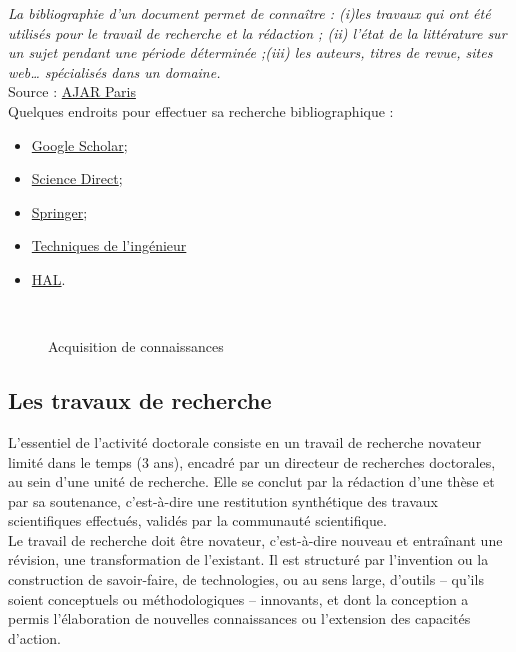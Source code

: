 \documentclass[a4paper,12pt]{report}
\begin{document}
\textit{La bibliographie d'un document permet de connaître : (i)les travaux qui ont été utilisés pour le travail de recherche et la rédaction ; (ii) l’état de la littérature sur un sujet pendant une période déterminée ;(iii) les auteurs, titres de revue, sites web… spécialisés dans un domaine.} \\

Source : \href{http://www.ajar-online.fr/thesememoire-2-recherche-bibliographique/}{AJAR Paris}    \\

Quelques endroits pour effectuer sa recherche bibliographique :
\begin{itemize}
\item \href{https://scholar.google.fr/}{Google Scholar};
\item \href{https://www-sciencedirect-com.camphrier-1.grenet.fr/}{Science Direct};
\item \href{https://link-springer-com.camphrier-1.grenet.fr/}{Springer};
\item \href{https://www-techniques-ingenieur-fr.camphrier-1.grenet.fr/}{Techniques de l'ingénieur}
\item \href{https://hal.archives-ouvertes.fr/}{HAL}.
\end{itemize}

\ \\

\begin{figure}[hbtp]
	\centering
	\def\svgwidth{1\columnwidth}
	\fontsize{10pt}{10pt}\selectfont
	\caption{Acquisition de connaissances}
	\label{figure_bouquins}
\end{figure}



\FloatBarrier
\subsection{Les travaux de recherche}

L’essentiel de l’activité doctorale consiste en un travail de recherche novateur limité dans le temps (3 ans), encadré par un directeur de recherches doctorales, au sein d’une unité de recherche. Elle se conclut par la rédaction d’une thèse et par sa soutenance, c’est-à-dire une restitution synthétique des travaux scientifiques  effectués, validés par la communauté scientifique. \\

Le travail de recherche doit être novateur, c’est-à-dire nouveau et entraînant une révision, une transformation de l’existant. Il est structuré par l’invention ou la construction de savoir-faire, de technologies, ou au sens large, d’outils – qu’ils soient conceptuels ou méthodologiques – innovants, et dont la conception a permis l’élaboration de nouvelles connaissances ou l’extension des capacités d’action. \\
\end{document}
